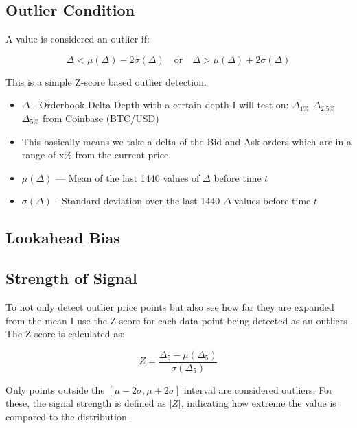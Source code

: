 \documentclass[12pt]{article}
\begin{document}
\subsection*{Outlier Condition}

A value is considered an outlier if:



\begin{equation}\label{eq: outlier_detection}
  \Delta < \mu(\Delta) - 2\sigma(\Delta) \quad \text{or} \quad \Delta > \mu(\Delta) + 2\sigma(\Delta)    
\end{equation}

This is a simple Z-score based outlier detection.

\begin{itemize}
  \item $\Delta$ - Orderbook Delta Depth with a certain depth I will test on: $\Delta_{1\%}$ $\Delta_{2.5\%}$ $\Delta_{5\%}$ from Coinbase (BTC/USD) 
  \item   This basically means we take a delta of the Bid and Ask orders which are in a range of x\% from the current price.
  \item $\mu(\Delta)$ — Mean of the last 1440 values of $\Delta$ before time $t$
  \item $\sigma(\Delta)$ - Standard deviation over the last 1440 $\Delta$ values before time $t$

\end{itemize}


\subsection*{Lookahead Bias}




\subsection*{Strength of Signal}

To not only detect outlier price points but also see how far they are expanded from the mean I use the Z-score for each data point being detected as an outliers
\newpage
The Z-score is calculated as:


$$Z = \frac{\Delta_5 - \mu(\Delta_5)}{\sigma(\Delta_5)}$$


Only points outside the $[\mu - 2\sigma, \mu + 2\sigma]$ interval are considered outliers.  
For these, the signal strength is defined as $|Z|$, indicating how extreme the value is compared to the distribution.
\end{document}
